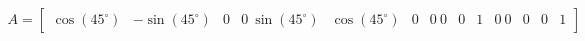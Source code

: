 \documentclass[preview]{standalone}
\begin{document}
\begin{align*}
A=\begin{bmatrix} \cos(45^\circ) & -\sin(45^\circ) & 0 & 0 \ \sin(45^\circ) & \cos(45^\circ) & 0 & 0 \ 0 & 0 & 1 & 0 \ 0 & 0 & 0 & 1 \end{bmatrix}
\end{align*}
\end{document}
